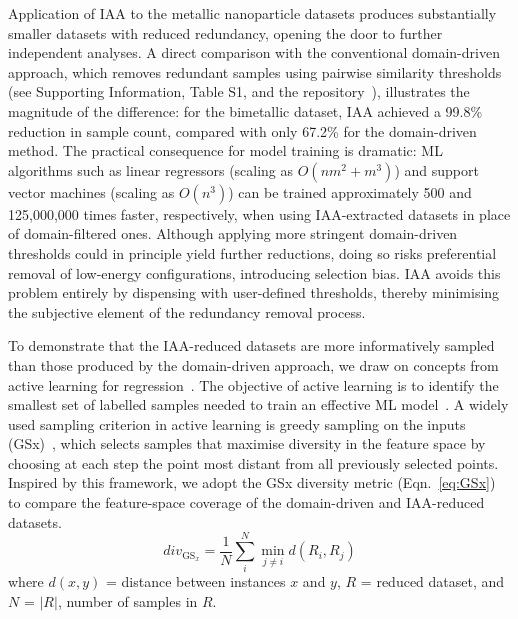 \documentclass{WileyMSP-template}
\begin{document}
Application of IAA to the metallic nanoparticle datasets produces substantially smaller datasets with reduced redundancy, opening the door to further independent analyses. A direct comparison with the conventional domain-driven approach, which removes redundant samples using pairwise similarity thresholds (see Supporting Information, Table S1, and the repository~\cite{SuppInfo}), illustrates the magnitude of the difference: for the bimetallic dataset, IAA achieved a 99.8\% reduction in sample count, compared with only 67.2\% for the domain-driven method. The practical consequence for model training is dramatic: ML algorithms such as linear regressors (scaling as $O(nm^2+m^3)$) and support vector machines (scaling as $O(n^3)$) can be trained approximately 500 and 125,000,000 times faster, respectively, when using IAA-extracted datasets in place of domain-filtered ones. Although applying more stringent domain-driven thresholds could in principle yield further reductions, doing so risks preferential removal of low-energy configurations, introducing selection bias. IAA avoids this problem entirely by dispensing with user-defined thresholds, thereby minimising the subjective element of the redundancy removal process.

To demonstrate that the IAA-reduced datasets are more informatively sampled than those produced by the domain-driven approach, we draw on concepts from active learning for regression~\cite{Wu2019GSx}. The objective of active learning is to identify the smallest set of labelled samples needed to train an effective ML model~\cite{Tharwat2023AL}. A widely used sampling criterion in active learning is greedy sampling on the inputs (GSx)~\cite{Wu2019GSx}, which selects samples that maximise diversity in the feature space by choosing at each step the point most distant from all previously selected points. Inspired by this framework, we adopt the GSx diversity metric (Eqn.~\ref{eq:GSx}) to compare the feature-space coverage of the domain-driven and IAA-reduced datasets.
\begin{equation} \label{eq:GSx}
    div_{\mathrm{GS}_x} = \frac{1}{N} \sum_i^N \min\limits_{j \neq i} d(R_i, R_j)
\end{equation}
where $d(x, y)$ = distance between instances $x$ and $y$, $R$ = reduced dataset, and $N$ = $|R|$, number of samples in $R$.
\end{document}
